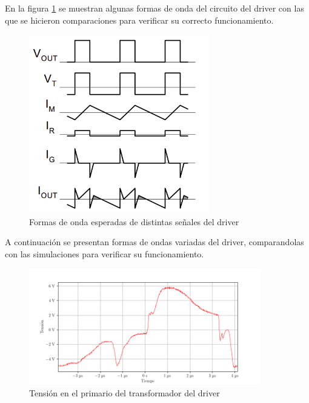 En la figura \ref{fig:driver_expected_waveforms} se muestran algunas formas de onda del circuito del driver con las que se hicieron comparaciones para verificar su correcto funcionamiento.

\begin{figure}[H]
    \centering
    \includegraphics[width=0.7\textwidth]{images/driver_expected_waveforms.png}
    \caption{Formas de onda esperadas de distintas señales del driver \cite{gatedrivers}}
    \label{fig:driver_expected_waveforms}
\end{figure}

A continuación se presentan formas de ondas variadas del driver, comparandolas con las simulaciones para verificar su funcionamiento.


\begin{figure}[H]
    \centering
    \includegraphics[width=0.9\textwidth]{images/capturas-osciloscopio/17-11-2022/7.png}
    \caption{Tensión en el primario del transformador del driver}
    \label{fig:osc:7}
\end{figure}

